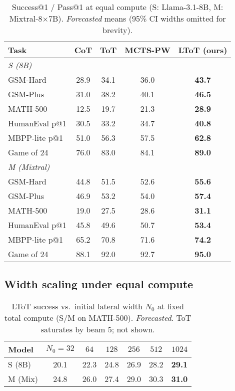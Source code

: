 \documentclass{article}
\begin{document}
\begin{table}[t]
\centering
\caption{Success@1 / Pass@1 at equal compute (S: Llama-3.1-8B, M: Mixtral-8$\times$7B). \emph{Forecasted} means (95\% CI widths omitted for brevity).}
\vspace{0.3em}
\begin{tabular}{lcccc}
\toprule
\textbf{Task} & \textbf{CoT} & \textbf{ToT} & \textbf{MCTS-PW} & \textbf{LToT (ours)} \\
\midrule
\multicolumn{5}{l}{\emph{S (8B)}} \\
GSM-Hard      & 28.9 & 34.1 & 36.0 & \textbf{43.7} \\
GSM-Plus      & 31.0 & 38.2 & 40.1 & \textbf{46.5} \\
MATH-500      & 12.5 & 19.7 & 21.3 & \textbf{28.9} \\
HumanEval p@1 & 30.5 & 33.2 & 34.7 & \textbf{40.8} \\
MBPP-lite p@1 & 51.0 & 56.3 & 57.5 & \textbf{62.8} \\
Game of 24    & 76.0 & 83.0 & 84.1 & \textbf{89.0} \\
\midrule
\multicolumn{5}{l}{\emph{M (Mixtral)}} \\
GSM-Hard      & 44.8 & 51.5 & 52.6 & \textbf{55.6} \\
GSM-Plus      & 46.9 & 53.2 & 54.0 & \textbf{57.4} \\
MATH-500      & 19.0 & 27.5 & 28.6 & \textbf{31.1} \\
HumanEval p@1 & 45.8 & 49.6 & 50.7 & \textbf{53.4} \\
MBPP-lite p@1 & 65.2 & 70.8 & 71.6 & \textbf{74.2} \\
Game of 24    & 88.1 & 92.0 & 92.7 & \textbf{95.0} \\
\bottomrule
\end{tabular}
\label{tab:equal-compute}
\end{table}


\subsection{Width scaling under equal compute}
\label{subsec:width-scaling}

\begin{table}[t]
\centering
\caption{LToT success vs.\ initial lateral width $N_0$ at fixed total compute (S/M on MATH-500). \emph{Forecasted}. ToT saturates by beam 5; not shown.}
\vspace{0.3em}
\begin{tabular}{lcccccc}
\toprule
\textbf{Model} & $N_0{=}32$ & $64$ & $128$ & $256$ & $512$ & $1024$ \\
\midrule
S (8B)   & 20.1 & 22.3 & 24.8 & 26.9 & 28.2 & \textbf{29.1} \\
M (Mix)  & 24.8 & 26.0 & 27.4 & 29.0 & 30.3 & \textbf{31.0} \\
\bottomrule
\end{tabular}
\label{tab:width-scaling}
\end{table}
\end{document}
